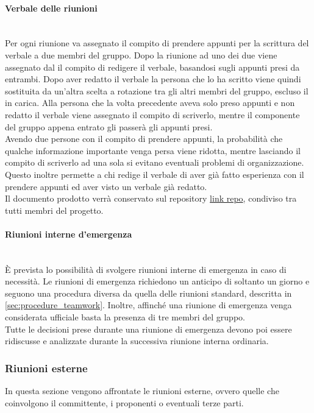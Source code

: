 \paragraph{Verbale delle riunioni}\label{sec:verbale_riunioni_interne}\mbox{}\\
Per ogni riunione va assegnato il compito di prendere appunti per la scrittura del verbale a due membri del gruppo. Dopo la riunione ad uno dei due viene assegnato dal \Responsabile{} il compito di redigere il verbale, basandosi sugli appunti presi da entrambi. Dopo aver redatto il verbale la persona che lo ha scritto viene quindi sostituita da un'altra scelta a rotazione tra gli altri membri del gruppo, escluso il \Responsabile{} in carica. Alla persona che la volta precedente aveva solo preso appunti e non redatto il verbale viene assegnato il compito di scriverlo, mentre il componente del gruppo appena entrato gli passerà gli appunti presi.\\
Avendo due persone con il compito di prendere appunti, la probabilità che qualche informazione importante venga persa viene ridotta, mentre lasciando il compito di scriverlo ad una sola si evitano eventuali problemi di organizzazione.
Questo inoltre permette a chi redige il verbale di aver già fatto esperienza con il prendere appunti ed aver visto un verbale già redatto.\\
Il documento prodotto verrà conservato sul repository \url{link repo}, condiviso tra tutti membri del progetto.

\paragraph{Riunioni interne d'emergenza}\label{sec:riunioni_emergenza}\mbox{}\\
È prevista lo possibilità di svolgere riunioni interne di emergenza in caso di necessità. Le riunioni di emergenza richiedono un anticipo di soltanto un giorno e seguono una procedura diversa da quella delle riunioni standard, descritta in \sezione \ref{sec:procedure_teamwork}. Inoltre, affinché una riunione di emergenza venga considerata ufficiale basta la presenza di tre membri del gruppo.\\
Tutte le decisioni prese durante una riunione di emergenza devono poi essere ridiscusse e analizzate durante la successiva riunione interna ordinaria.

\subsubsection{Riunioni esterne}
In questa sezione vengono affrontate le riunioni esterne, ovvero quelle che coinvolgono il committente, i proponenti o eventuali terze parti.

